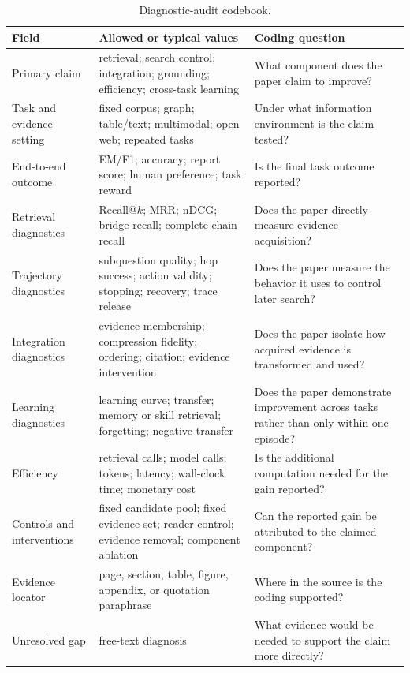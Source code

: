 \begin{table}[tbp]
\centering
\caption{Diagnostic-audit codebook.}
\label{tab:audit_codebook}
\small
\begin{tabularx}{\textwidth}{@{}p{3.0cm}p{3.6cm}Y@{}}
\toprule
Field & Allowed or typical values & Coding question \\
\midrule
Primary claim & retrieval; search control; integration; grounding; efficiency; cross-task learning & What component does the paper claim to improve? \\
Task and evidence setting & fixed corpus; graph; table/text; multimodal; open web; repeated tasks & Under what information environment is the claim tested? \\
End-to-end outcome & EM/F1; accuracy; report score; human preference; task reward & Is the final task outcome reported? \\
Retrieval diagnostics & Recall@$k$; MRR; nDCG; bridge recall; complete-chain recall & Does the paper directly measure evidence acquisition? \\
Trajectory diagnostics & subquestion quality; hop success; action validity; stopping; recovery; trace release & Does the paper measure the behavior it uses to control later search? \\
Integration diagnostics & evidence membership; compression fidelity; ordering; citation; evidence intervention & Does the paper isolate how acquired evidence is transformed and used? \\
Learning diagnostics & learning curve; transfer; memory or skill retrieval; forgetting; negative transfer & Does the paper demonstrate improvement across tasks rather than only within one episode? \\
Efficiency & retrieval calls; model calls; tokens; latency; wall-clock time; monetary cost & Is the additional computation needed for the gain reported? \\
Controls and interventions & fixed candidate pool; fixed evidence set; reader control; evidence removal; component ablation & Can the reported gain be attributed to the claimed component? \\
Evidence locator & page, section, table, figure, appendix, or quotation paraphrase & Where in the source is the coding supported? \\
Unresolved gap & free-text diagnosis & What evidence would be needed to support the claim more directly? \\
\bottomrule
\end{tabularx}
\end{table}

